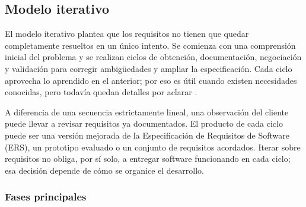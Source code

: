 \subsection{Modelo iterativo}
\label{sec:modelo-iterativo}

El modelo iterativo plantea que los requisitos no tienen que quedar completamente
resueltos en un único intento. Se comienza con una comprensión inicial del
problema y se realizan ciclos de obtención, documentación, negociación y
validación para corregir ambigüedades y ampliar la especificación. Cada ciclo
aprovecha lo aprendido en el anterior; por eso es útil cuando existen
necesidades conocidas, pero todavía quedan detalles por aclarar
\cite{sommerville2016,pohl2025}.

A diferencia de una secuencia estrictamente lineal, una observación del cliente
puede llevar a revisar requisitos ya documentados. El producto de cada ciclo
puede ser una versión mejorada de la Especificación de Requisitos de Software
(ERS), un prototipo evaluado o un conjunto de requisitos acordados. Iterar
sobre requisitos no obliga, por sí solo, a entregar software funcionando en
cada ciclo; esa decisión depende de cómo se organice el desarrollo.

\subsubsection{Fases principales}

